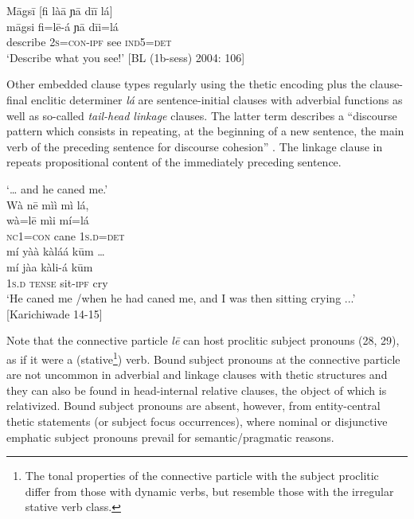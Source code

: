 \documentclass[output=paper]{langsci/langscibook}
\begin{document}
\ea
\glll \textup{}  M\={a}gs\={i}    \textup{[}fi là\={a}     ɲ\={a}  d\={i}\={i}   lá\textup{]}\\
  \textup{  m\={a}gsi    fi=l\={e}-á     ɲ\={a}  d\={i}i=lá}\\
       describe    2\textsc{s}=\textsc{con}-\textsc{ipf}   see     \textsc{ind}5=\textsc{det}\\
\glt ‘Describe what you see!’ [BL (1b-sess) 2004: 106]
\z

Other embedded clause types regularly using the thetic encoding plus the clause-final enclitic determiner \textit{lá} are sentence-initial clauses with adverbial functions as well as so-called \textit{tail-head linkage} clauses. The latter term describes a “discourse pattern which consists in repeating, at the beginning of a new sentence, the main verb of the preceding sentence for discourse cohesion” \citep[109]{Guillaume2011}. The linkage clause in  repeats propositional content of the immediately preceding sentence. 

\ea
‘… and he caned me.’\\
\glll   Wà  n\={e}  mìì  mì   lá,\\
  \textup{  wà=l\={e}  mìi  mí=lá}\\
     \textsc{  nc}1=\textsc{con}\textsubscript{ } cane  1\textsc{s}.\textsc{d}=\textsc{det}\\
\glll   mí    yàà  kàláá    k\={u}m …\\
  \textup{  mí    jàa  kàli-á    k\={u}m}\\
       1\textsc{s}.\textsc{d}  \textsc{tense}  sit-\textsc{ipf}    cry\\
\glt ‘He caned me /when he had caned me, and I was then sitting crying ...’ [Karichiwade 14-15]
\z

Note that the connective particle \textit{l\={e}} can host proclitic subject pronouns (28, 29), as if it were a (stative\footnote{The tonal properties of the connective particle with the subject proclitic differ from those with dynamic verbs, but resemble those with the irregular stative verb class.}) verb. Bound subject pronouns at the connective particle are not uncommon in adverbial and linkage clauses with thetic structures and they can also be found in head-internal relative clauses, the object of which is relativized. Bound subject pronouns are absent, however, from entity-central thetic statements (or subject focus occurrences), where nominal or disjunctive emphatic subject pronouns prevail for semantic/pragmatic reasons.
\end{document}
